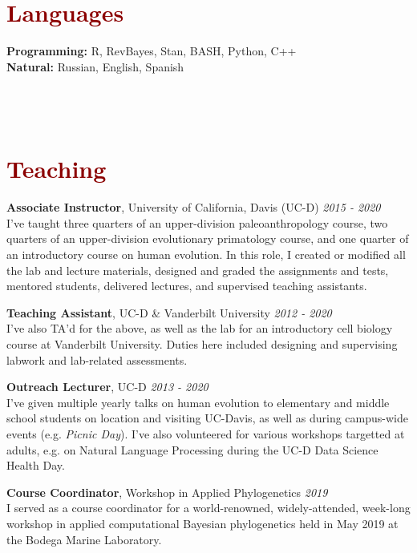 \documentclass[11pt,margin,line]{resume}
\begin{document}
\begin{resume}
\vspace{-1.5mm}
    \section{\large\textcolor{DarkRed}{Languages}}

    \textbf{Programming:} R, RevBayes, Stan, BASH, Python, C++\\
    \textbf{Natural:} Russian, English, Spanish\\\\\\\\


\section{\large\textcolor{DarkRed}{Teaching}}

\textbf{Associate Instructor}, University of California, Davis (UC-D) \hfill \emph{2015  - 2020}\\
I’ve taught three quarters of an upper-division paleoanthropology course, two quarters of an upper-division evolutionary primatology course, and one quarter of an introductory course on human evolution. In this role, I created or modified all the lab and lecture materials, designed and graded the assignments and tests, mentored students, delivered lectures, and supervised teaching assistants.

\textbf{Teaching Assistant}, UC-D \& Vanderbilt University \hfill \emph{2012  - 2020}\\
I've also TA'd for the above, as well as the lab for an introductory cell biology course at Vanderbilt University. Duties here included designing and supervising labwork and lab-related assessments.

\vspace{-1.5mm}
\textbf{Outreach Lecturer}, UC-D \hfill \emph{2013  - 2020}\\
I've given multiple yearly talks on human evolution to elementary and middle school students on location and visiting UC-Davis, as well as during campus-wide events (e.g. \emph{Picnic Day}). I've also volunteered for various workshops targetted at adults, e.g. on Natural Language Processing during the UC-D Data Science Health Day.

\vspace{-1.5mm}
\textbf{Course Coordinator}, Workshop in Applied Phylogenetics \hfill \emph{2019}\\
I served as a course coordinator for a world-renowned, widely-attended, week-long workshop in applied computational Bayesian phylogenetics held in May 2019 at the Bodega Marine Laboratory.


\end{resume}
\end{document}
